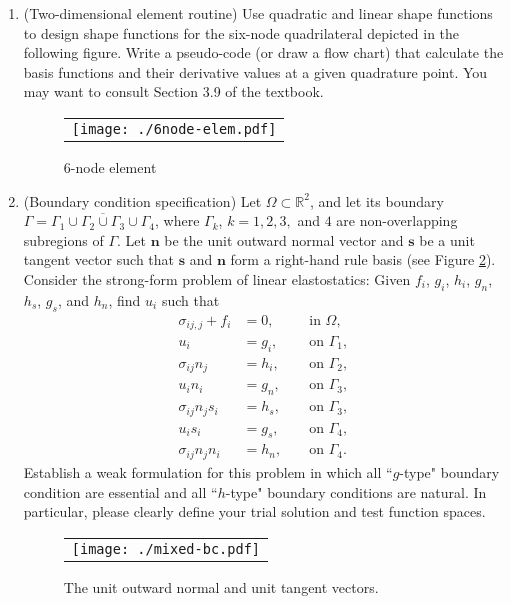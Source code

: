 \documentclass[12pt]{article}
\begin{document}
\begin{enumerate}
\item (Two-dimensional element routine) Use quadratic and linear shape functions to design shape functions for the six-node quadrilateral depicted in the following figure. Write a pseudo-code (or draw a flow chart) that calculate the basis functions and their derivative values at a given quadrature point. You may want to consult Section 3.9 of the textbook.

\begin{figure}[h]
	\begin{center}
	\begin{tabular}{c}
\texttt{[image: ./6node-elem.pdf]}
\end{tabular}
\end{center} 
\caption{6-node element}
\label{fig:quad_elem}
\end{figure}

\item(Boundary condition specification) Let $\Omega \subset \mathbb R^2$, and let its boundary $\Gamma = \overline{\Gamma_1 \cup \Gamma_2\cup \Gamma_3 \cup \Gamma_4}$, where $\Gamma_k$, $k=1,2,3,$ and $4$ are non-overlapping subregions of $\Gamma$. Let $\bm n$ be the unit outward normal vector and $\bm s$ be a unit tangent vector such that $\bm s$ and $\bm n$ form a right-hand rule basis (see Figure \ref{fig:mix-bc}). Consider the strong-form problem of linear elastostatics: Given $f_i$, $g_i$, $h_i$, $g_n$, $h_s$, $g_s$, and $h_n$, find $u_i$ such that
\begin{align*}
\sigma_{ij,j} + f_i &= 0, && \mbox{ in } \Omega, \\
u_i &= g_i, && \mbox{ on } \Gamma_1, \\
\sigma_{ij}n_j &= h_i, &&\mbox{ on } \Gamma_2,\\
u_i n_i &= g_n, && \mbox{ on } \Gamma_3, \\
\sigma_{ij}n_js_i &= h_s, && \mbox{ on } \Gamma_3, \\
u_i s_i &= g_s, && \mbox{ on } \Gamma_4, \\
\sigma_{ij}n_jn_i &= h_n, && \mbox{ on } \Gamma_4.
\end{align*} 
Establish a weak formulation for this problem in which all ``$g$-type" boundary condition are essential and all ``$h$-type" boundary conditions are natural. In particular, please clearly define your trial solution and test function spaces.

\begin{figure}[ht]
	\begin{center}
	\begin{tabular}{c}
\texttt{[image: ./mixed-bc.pdf]}
\end{tabular}
\end{center} 
\caption{The unit outward normal and unit tangent vectors.}
\label{fig:mix-bc}
\end{figure}


\end{enumerate}
\end{document}
